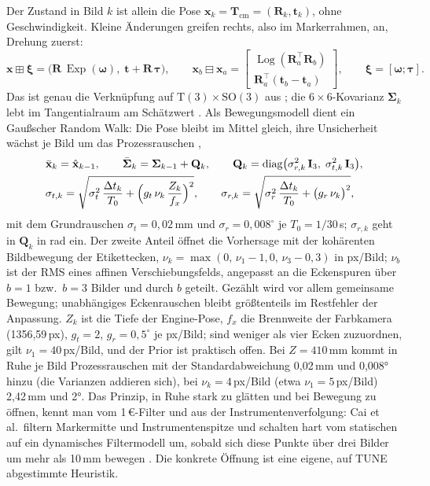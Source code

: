\documentclass[11pt,a4paper,fleqn]{article}
\newcommand{\Tcm}{\mathbf{T}_{\mathrm{cm}}}
\newcommand{\xb}{\bar{\mathbf{x}}_k}
\newcommand{\xh}{\hat{\mathbf{x}}}
\newcommand{\Sb}{\bar{\boldsymbol{\Sigma}}_k}
\newcommand{\Exp}{\operatorname{Exp}}
\newcommand{\Log}{\operatorname{Log}}
\begin{document}
Der Zustand in Bild $k$ ist allein die Pose $\mathbf{x}_k = \Tcm = (\mathbf{R}_k, \mathbf{t}_k)$, ohne
Geschwindigkeit. Kleine Änderungen greifen rechts, also im Markerrahmen, an, Drehung zuerst:
\begin{equation}
  \mathbf{x} \boxplus \boldsymbol{\xi} = \bigl(\mathbf{R}\,\Exp(\boldsymbol{\omega}),\;
     \mathbf{t} + \mathbf{R}\,\boldsymbol{\tau}\bigr),
  \qquad
  \mathbf{x}_b \boxminus \mathbf{x}_a = \begin{bmatrix} \Log(\mathbf{R}_a^{\top}\mathbf{R}_b) \\
     \mathbf{R}_a^{\top}(\mathbf{t}_b - \mathbf{t}_a) \end{bmatrix},
  \qquad \boldsymbol{\xi} = [\boldsymbol{\omega}; \boldsymbol{\tau}] .
  \label{eq:boxplus}
\end{equation}
Das ist genau die Verknüpfung auf $\mathrm{T}(3)\times\mathrm{SO}(3)$ aus \cite[Bsp.~7]{sola2018micro}; die
$6\times6$-Kovarianz $\boldsymbol{\Sigma}_k$ lebt im Tangentialraum am Schätzwert \cite[Gl.~51--52]{sola2018micro}.
Als Bewegungsmodell dient ein Gaußscher Random Walk: Die Pose bleibt im Mittel gleich, ihre Unsicherheit wächst je
Bild um das Prozessrauschen \cite[Bsp.~4.1, 4.2]{saerkkae2013bayesian},
\begin{align}
  &\xb = \xh_{k-1}, \qquad \Sb = \boldsymbol{\Sigma}_{k-1} + \mathbf{Q}_k, \qquad
  \mathbf{Q}_k = \operatorname{diag}\bigl(\sigma_{r,k}^2\,\mathbf{I}_3,\; \sigma_{t,k}^2\,\mathbf{I}_3\bigr),
  \label{eq:predict}\\
  &\sigma_{t,k} = \sqrt{\sigma_t^2\,\frac{\Delta t_k}{T_0} + \Bigl(g_t\,\nu_k\,\frac{Z_k}{f_x}\Bigr)^{2}},
  \qquad
  \sigma_{r,k} = \sqrt{\sigma_r^2\,\frac{\Delta t_k}{T_0} + \bigl(g_r\,\nu_k\bigr)^{2}},
  \label{eq:Q}
\end{align}
mit dem Grundrauschen $\sigma_t = 0{,}02$\,mm und $\sigma_r = 0{,}008^{\circ}$ je $T_0 = 1/30$\,s;
$\sigma_{r,k}$ geht in $\mathbf{Q}_k$ in rad ein. Der zweite Anteil öffnet die Vorhersage mit der kohärenten
Bildbewegung der Etikettecken, $\nu_k = \max(0,\, \nu_1 - 1{,}0,\, \nu_3 - 0{,}3)$ in px/Bild; $\nu_b$ ist der
RMS eines affinen Verschiebungsfelds, angepasst an die Eckenspuren über $b = 1$ bzw.\ $b = 3$ Bilder und durch $b$
geteilt. Gezählt wird vor allem gemeinsame Bewegung; unabhängiges Eckenrauschen bleibt größtenteils im
Restfehler der Anpassung. $Z_k$ ist die Tiefe der Engine-Pose, $f_x$ die Brennweite der Farbkamera
(1356,59\,px), $g_t = 2$, $g_r = 0{,}5^{\circ}$ je px/Bild; sind weniger als vier Ecken zuzuordnen, gilt
$\nu_1 = 40$\,px/Bild, und der Prior ist praktisch offen. Bei $Z = 410$\,mm kommt in Ruhe je Bild
Prozessrauschen mit der Standardabweichung 0,02\,mm und 0,008° hinzu (die Varianzen addieren sich), bei
$\nu_k = 4$\,px/Bild (etwa $\nu_1 = 5$\,px/Bild) 2,42\,mm und 2°. Das Prinzip, in Ruhe stark zu glätten und bei
Bewegung zu öffnen, kennt man vom 1\,€-Filter \cite{casiez2012oneeuro} und aus der Instrumentenverfolgung: Cai et
al.\ filtern Markermitte und Instrumentenspitze und schalten hart vom statischen auf ein dynamisches Filtermodell
um, sobald sich diese Punkte über drei Bilder um mehr als 10\,mm bewegen \cite[S.~279--280]{cai2024distributed}.
Die konkrete Öffnung ist eine eigene, auf TUNE abgestimmte Heuristik.
\end{document}
